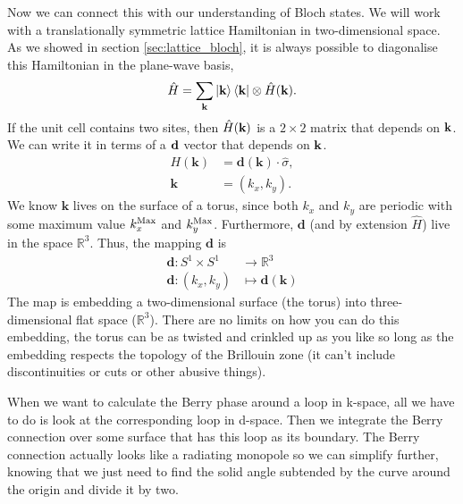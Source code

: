 Now we can connect this with our understanding of Bloch states. We will work with a translationally symmetric lattice Hamiltonian in two-dimensional space. As we showed in section \ref{sec:lattice_bloch}, it is always possible to diagonalise this Hamiltonian in the plane-wave basis,
\begin{align}
	\hat H = \sum_{\bf k} \ket{\bf k}\bra{\bf k} \otimes \hat H (\bf k).
\end{align}
If the unit cell contains two sites, then $\hat H (\bf k)$ is a $2 \times 2$ matrix that depends on $\bf k$. We can write it in terms of a $\bf d$ vector that depends on $\bf k$.
\begin{align}
H(\textbf{k}) &= \textbf{d}(\textbf{k})\cdot \hat{\sigma}, \\
    \textbf{k} &= (k_x,k_y).
\end{align}
We know $\textbf{k}$ lives on the surface of a torus, since both $k_x$ and $k_y$ are periodic with some maximum value $k_{x}^{\textup{Max}}$ and $k_{y}^{\textup{Max}}$. Furthermore, $\textbf{d}$ (and by extension $\hat H$) live in the space $\mathbb{R}^3$. Thus, the mapping $\textbf{d}$ is
\begin{align}
    \textbf{d} : S^1 \times S^1 &\rightarrow \mathbb{R}^3 \\
    \textbf{d} : (k_x,k_y) &\mapsto \textbf{d}(\textbf{k})
\end{align}
The map is embedding a two-dimensional surface (the torus) into three-dimensional flat space ($\mathbb{R}^3$). There are no limits on how you can do this embedding, the torus can be as twisted and crinkled up as you like so long as the embedding respects the topology of the Brillouin zone (it can't include discontinuities or cuts or other abusive things).\par
When we want to calculate the Berry phase around a loop in k-space, all we have to do is look at the corresponding loop in d-space. Then we integrate the Berry connection over some surface that has this loop as its boundary. The Berry connection actually looks like a radiating monopole so we can simplify further, knowing that we just need to find the solid angle subtended by the curve around the origin and divide it by two.\par


